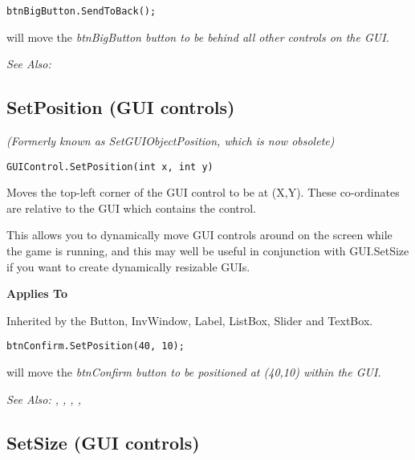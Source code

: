 \begin{verbatim}
btnBigButton.SendToBack();
\end{verbatim}
will move the \it{btnBigButton} button to be behind all other controls on the GUI.

\it{See Also:} 


\subsection{SetPosition (GUI controls)}\label{GUIControl.SetPosition}%

\it{(Formerly known as SetGUIObjectPosition, which is now obsolete)}

\begin{verbatim}
GUIControl.SetPosition(int x, int y)
\end{verbatim}
Moves the top-left corner of the GUI control to be at (X,Y). These co-ordinates
are relative to the GUI which contains the control.

This allows you to dynamically move GUI controls around on the screen while the
game is running, and this may well be useful in conjunction with GUI.SetSize if you
want to create dynamically resizable GUIs.

\bf{Applies To}

Inherited by the Button, InvWindow, Label, ListBox, Slider and TextBox.

\begin{verbatim}
btnConfirm.SetPosition(40, 10);
\end{verbatim}
will move the \it{btnConfirm} button to be positioned at (40,10) within the GUI.

\it{See Also:} ,
, ,
, 


\subsection{SetSize (GUI controls)}\label{GUIControl.SetSize}%

